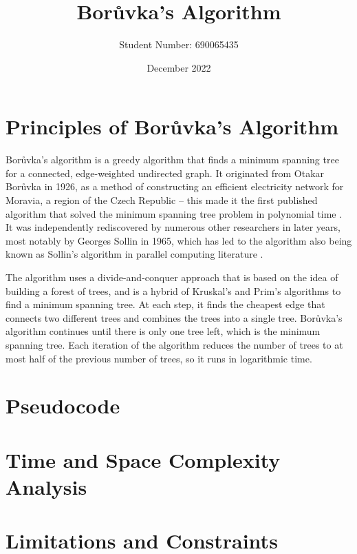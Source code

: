 \documentclass[a4paper, 11pt]{article}
\begin{document}
\title{Borůvka's Algorithm}
\author{Student Number: 690065435}
\date{December 2022}
\maketitle

\section{Principles of Borůvka's Algorithm}
Borůvka's algorithm is a greedy algorithm that finds a minimum spanning tree for a connected, edge-weighted undirected graph. It originated from Otakar Borůvka in 1926, as a method of constructing an efficient electricity network for Moravia, a region of the Czech Republic \cite{nevsetvril2001otakar} -- this made it the first published algorithm that solved the minimum spanning tree problem in polynomial time \cite{deterministicMSTs}. It was independently rediscovered by numerous other researchers in later years, most notably by Georges Sollin in 1965, which has led to the algorithm also being known as Sollin's algorithm in parallel computing literature \cite{sollin1965trace}. 

The algorithm uses a divide-and-conquer approach that is based on the idea of building a forest of trees, and is a hybrid of Kruskal's and Prim's algorithms to find a minimum spanning tree. At each step, it finds the cheapest edge that connects two different trees and combines the trees into a single tree. Borůvka's algorithm continues until there is only one tree left, which is the minimum spanning tree. Each iteration of the algorithm reduces the number of trees to at most half of the previous number of trees, so it runs in logarithmic time.

\section{Pseudocode}

\section{Time and Space Complexity Analysis}

\section{Limitations and Constraints}
\end{document}
